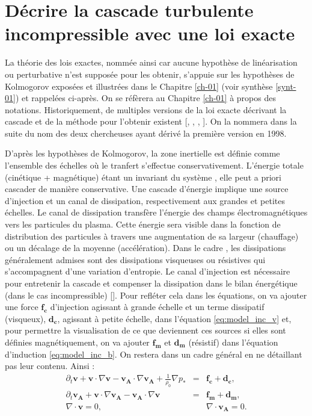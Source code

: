 \section{Décrire la cascade turbulente incompressible avec une loi exacte}\label{sec-113}

La théorie des lois exactes, nommée ainsi car aucune hypothèse de linéarisation ou perturbative n'est supposée pour les obtenir, s'appuie sur les hypothèses de Kolmogorov exposées et illustrées dans le Chapitre \ref{ch-01} (voir synthèse \ref{synt-01}) et rappelées ci-après. On se réfèrera au Chapitre \ref{ch-01} à propos des notations. Historiquement, de multiples versions de la loi exacte décrivant la cascade  et de la méthode pour l'obtenir existent [\cite{politano_von_1998}, \cite{politano_dynamical_1998}, \cite{macbride_turbulent_2008}, \cite{galtier_origin_2018}]. On la nommera dans la suite  du nom des deux chercheuses ayant dérivé la première version en 1998.

D'après les hypothèses de Kolmogorov, la zone inertielle est définie comme l'ensemble des échelles où le tranfert s'effectue conservativement. L'énergie totale (cinétique + magnétique) étant un invariant du système , elle peut a priori cascader de manière conservative. 
Une cascade d'énergie implique une source d'injection et un canal de dissipation, respectivement aux grandes et petites échelles. Le canal de dissipation transfère l'énergie des champs électromagnétiques vers les particules du plasma. Cette énergie sera visible dans la fonction de distribution des particules à travers une augmentation de sa largeur (chauffage) ou un décalage de la moyenne (accélération). Dans le cadre , les dissipations généralement admises sont des dissipations visqueuses ou résistives qui s'accompagnent d'une variation d'entropie. 
Le canal d'injection est nécessaire pour entretenir la cascade et compenser la dissipation dans le bilan énergétique (dans le cas incompressible) [\cite{galtier_physique_2021}]. Pour refléter cela dans les équations, on va ajouter une force $\boldsymbol{f_c}$ d'injection agissant à grande échelle et un terme dissipatif (visqueux), $\boldsymbol{d_c}$, agissant à petite échelle, dans l'équation \eqref{eq:model_inc_v} et, pour permettre la visualisation de ce que deviennent ces sources si elles sont définies magnétiquement, on va ajouter $\boldsymbol{f_m}$ et $\boldsymbol{d_m}$ (résistif) dans l'équation d'induction \eqref{eq:model_inc_b}. On restera dans un cadre général en ne détaillant pas leur contenu. Ainsi :
\begin{eqnarray}
\label{eq:turb_inc_v} \partial_t \boldsymbol{v} + \boldsymbol{v} \cdot \nabla \boldsymbol{v} -  \boldsymbol{v_A} \cdot \nabla \boldsymbol{v_A} + \frac{1}{\rho_0} \nabla p_* &=&  \boldsymbol{f_c} + \boldsymbol{d_c} , \\
\label{eq:turb_inc_b}  \partial_t \boldsymbol{v_A} + \boldsymbol{v} \cdot \nabla \boldsymbol{v_A} -  \boldsymbol{v_A} \cdot \nabla \boldsymbol{v}&=& \boldsymbol{f_m} + \boldsymbol{d_m} ,\\
\label{eq:turb_inc_r}  \nabla \cdot \boldsymbol{v} = 0, && \nabla \cdot \boldsymbol{v_A} = 0.
\end{eqnarray}

